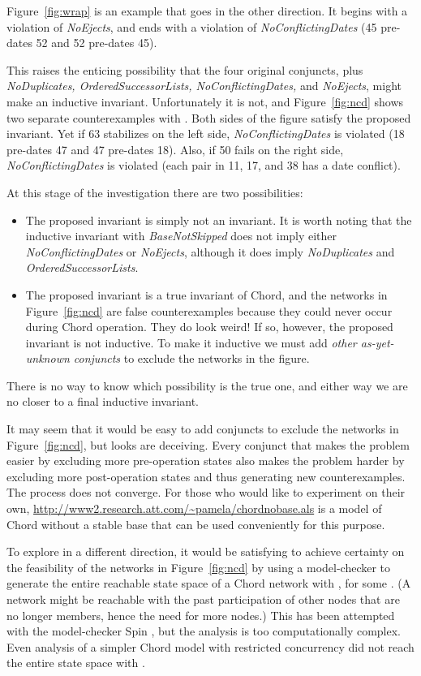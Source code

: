 \documentclass[conference]{IEEEtran}
\begin{document}
Figure~\ref{fig:wrap} is an example that goes in the other direction.
It begins with a violation of
{\it NoEjects}, and ends with a violation of
{\it NoConflictingDates} (45 pre-dates 52 and 52 pre-dates 45).

This raises the enticing possibility that the four original
conjuncts, plus {\it NoDuplicates, OrderedSuccessorLists, 
NoConflictingDates,} and {\it NoEjects}, might make an inductive
invariant.
Unfortunately it is not, and
Figure~\ref{fig:ncd} shows two separate counterexamples
with .
Both sides of the figure satisfy the proposed invariant.
Yet if 63 stabilizes on the left side, 
{\it NoConflictingDates} is violated (18 pre-dates 47 and 47 pre-dates
18).
Also, if 50 fails on the right side,
{\it NoConflictingDates} is violated (each pair in 11, 17, and 38 has
a date conflict).

At this stage of the investigation there are two possibilities:
\begin{itemize}
\item
The proposed invariant is simply not an invariant.
It is worth noting that the inductive invariant with {\it BaseNotSkipped}
does not imply either {\it NoConflictingDates} or
{\it NoEjects}, although it does imply {\it NoDuplicates} and
{\it OrderedSuccessorLists}.
\item
The proposed invariant is a true invariant of Chord, and
the networks in Figure~\ref{fig:ncd} are false counterexamples
because they could never occur during Chord operation.
They do look weird!
If so, however, the proposed invariant is not inductive.
To make it inductive we must add {\it other as-yet-unknown
conjuncts} to exclude the networks in the figure.
\end{itemize}
There is no way to know which possibility is the true one, and
either way we are no closer to a final inductive invariant.

It may seem that it would be easy to add conjuncts to exclude
the networks in Figure~\ref{fig:ncd}, but looks are deceiving.
Every conjunct that makes the problem easier by excluding 
more pre-operation
states also makes the problem harder by excluding more
post-operation states and thus generating new counterexamples.
The process does not converge.
For those who would like to experiment on their own,
\url{http://www2.research.att.com/~pamela/chordnobase.als}
is a model of Chord without a stable base that can be used
conveniently for this purpose.

To explore in a different direction,
it would be satisfying to achieve certainty on the feasibility
of the networks in Figure~\ref{fig:ncd} by 
using a model-checker to generate the entire reachable state space of a
Chord network with , for some .
(A network might be reachable with the past participation
of other nodes that are no longer members, hence the need for more
nodes.)
This has been attempted with the model-checker Spin \cite{spin}, but
the analysis is too computationally complex.
Even analysis of a simpler Chord model with restricted concurrency
did not reach the entire state space with  \cite{compare}.
\end{document}
